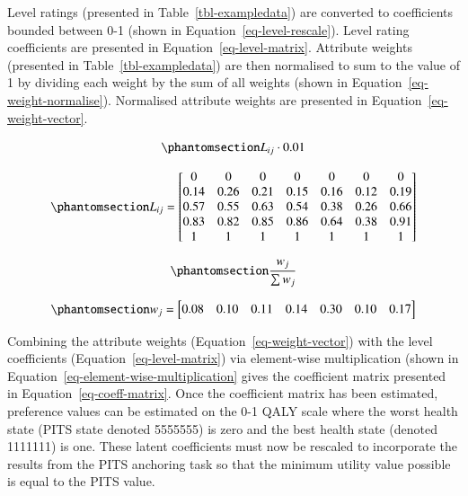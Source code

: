 \documentclass[
  number,
  preprint]{elsarticle}
\begin{document}
Level ratings (presented in Table~\ref{tbl-exampledata}) are converted
to coefficients bounded between 0-1 (shown in
Equation~\ref{eq-level-rescale}). Level rating coefficients are
presented in Equation~\ref{eq-level-matrix}. Attribute weights
(presented in Table~\ref{tbl-exampledata}) are then normalised to sum to
the value of 1 by dividing each weight by the sum of all weights (shown
in Equation~\ref{eq-weight-normalise}). Normalised attribute weights are
presented in Equation~\ref{eq-weight-vector}.

\begin{equation}\phantomsection\label{eq-level-rescale}{
    L_{ij} \cdot 0.01
}\end{equation}

\begin{equation}\phantomsection\label{eq-level-matrix}{
L_{ij} = 
\begin{bmatrix}
0 & 0 & 0 & 0 & 0 & 0 & 0 \\
0.14 & 0.26 & 0.21 & 0.15 & 0.16 & 0.12 & 0.19 \\
0.57 & 0.55 & 0.63 & 0.54 & 0.38 & 0.26 & 0.66 \\
0.83 & 0.82 & 0.85 & 0.86 & 0.64 & 0.38 & 0.91 \\
1 & 1 & 1 & 1 & 1 & 1 & 1 \\
\end{bmatrix}
}\end{equation}

\begin{equation}\phantomsection\label{eq-weight-normalise}{
    \frac{w_{j}}{\sum{w_j}}
}\end{equation}

\begin{equation}\phantomsection\label{eq-weight-vector}{
w_j = \begin{bmatrix}
    0.08& 0.10& 0.11& 0.14& 0.30& 0.10& 0.17
\end{bmatrix} 
}\end{equation}

Combining the attribute weights (Equation~\ref{eq-weight-vector}) with
the level coefficients (Equation~\ref{eq-level-matrix}) via element-wise
multiplication (shown in Equation~\ref{eq-element-wise-multiplication}
gives the coefficient matrix presented in
Equation~\ref{eq-coeff-matrix}. Once the coefficient matrix has been
estimated, preference values can be estimated on the 0-1 QALY scale
where the worst health state (PITS state denoted 5555555) is zero and
the best health state (denoted 1111111) is one. These latent
coefficients must now be rescaled to incorporate the results from the
PITS anchoring task so that the minimum utility value possible is equal
to the PITS value.
\end{document}
